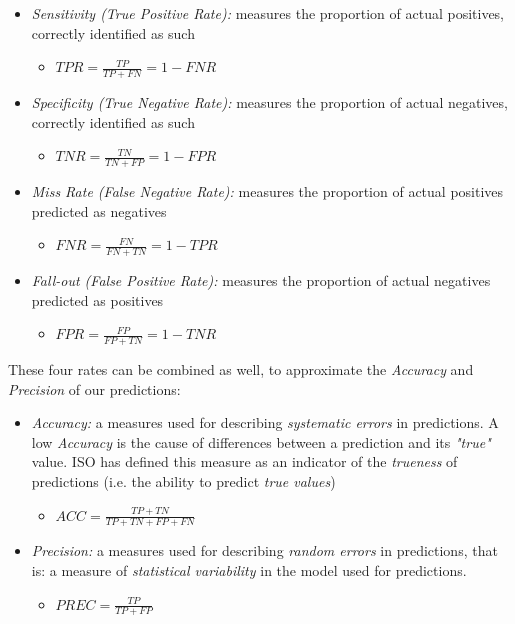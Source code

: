 \begin{itemize}
	\item \textsl{Sensitivity (True Positive Rate):} measures the proportion of actual positives, correctly identified as such
	\begin{itemize}
		\item[] $TPR = \frac{TP}{TP+FN} = 1-FNR$
	\end{itemize}
	\item \textsl{Specificity (True Negative Rate):} measures the proportion of actual negatives, correctly identified as such
	\begin{itemize}
		\item[] $TNR = \frac{TN}{TN+FP} = 1-FPR$
	\end{itemize}
	\item \textsl{Miss Rate (False Negative Rate):} measures the proportion of actual positives predicted as negatives
	\begin{itemize}
		\item[] $FNR = \frac{FN}{FN+TN} = 1-TPR$
	\end{itemize}
	\item \textsl{Fall-out (False Positive Rate):} measures the proportion of actual negatives predicted as positives
	\begin{itemize}
		\item[] $FPR = \frac{FP}{FP+TN} = 1-TNR$
	\end{itemize}
\end{itemize}

These four rates can be combined as well, to approximate the \textsl{Accuracy} and \textsl{Precision} of our predictions:

\begin{itemize}
	\item \textsl{Accuracy:} a measures used for describing \textsl{systematic errors} in predictions. A low \textsl{Accuracy} is the cause of differences between a prediction and its \textsl{"true"} value. ISO has defined this measure as an indicator of the \textsl{trueness} of predictions (i.e. the ability to predict \textsl{true values}) \cite{isoacc}
	\begin{itemize}
		\item[] $ACC = \frac{TP+TN}{TP+TN+FP+FN}$
	\end{itemize}
	\item \textsl{Precision:} a measures used for describing \textsl{random errors} in predictions, that is: a measure of \textsl{statistical variability} in the model used for predictions.
	\begin{itemize}
	\item[] $PREC = \frac{TP}{TP+FP}$
	\end{itemize}
\end{itemize}

